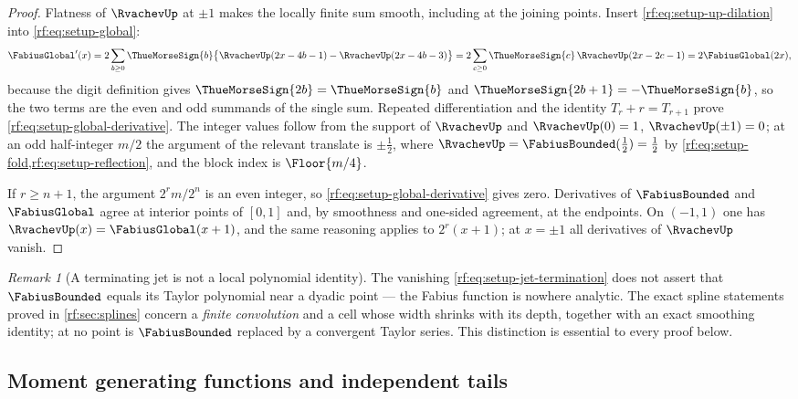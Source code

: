 \documentclass[11pt,oneside]{article}
\theoremstyle{plain}
\theoremstyle{definition}
\theoremstyle{remark}
\newtheorem{remark}[theorem]{Remark}
\newcommand{\Fb}{\FabiusBounded}            %
\newcommand{\Fg}{\FabiusGlobal}             %
\newcommand{\up}{\RvachevUp}                %
\newcommand{\tm}[1]{\ThueMorseSign{#1}}     %
\newcommand{\Tr}[1]{T_{#1}}                 %
\begin{document}
\begin{proof}
Flatness of $\up$ at $\pm1$ makes the locally finite sum smooth, including
at the joining points.  Insert \cref{rf:eq:setup-up-dilation} into
\cref{rf:eq:setup-global}:
\[
 \Fg'(x)=2\sum_{b\ge0}\tm{b}\bigl\{\up(2x-4b-1)-\up(2x-4b-3)\bigr\}
 =2\sum_{c\ge0}\tm{c}\,\up(2x-2c-1)=2\Fg(2x),
\]
because the digit definition gives $\tm{2b}=\tm{b}$ and
$\tm{2b+1}=-\tm{b}$, so the two terms are the even and odd summands of the
single sum.  Repeated differentiation and the identity
$\Tr{r}+r=\Tr{r+1}$ prove \cref{rf:eq:setup-global-derivative}.  The
integer values follow from the support of $\up$ and $\up(0)=1$, $\up(\pm1)=0$;
at an odd half-integer $m/2$ the argument of the relevant translate is
$\pm\tfrac12$, where $\up=\Fb(\tfrac12)=\tfrac12$ by
\cref{rf:eq:setup-fold,rf:eq:setup-reflection}, and the block index is
$\Floor{m/4}$.

If $r\ge n+1$, the argument $2^{r}m/2^{n}$ is an even integer, so
\cref{rf:eq:setup-global-derivative} gives zero.  Derivatives of $\Fb$ and
$\Fg$ agree at interior points of $[0,1]$ and, by smoothness and one-sided
agreement, at the endpoints.  On $(-1,1)$ one has $\up(x)=\Fg(x+1)$, and the
same reasoning applies to $2^{r}(x+1)$; at $x=\pm1$ all derivatives of $\up$
vanish.
\end{proof}

\begin{remark}[A terminating jet is not a local polynomial identity]
\label{rf:rmk:setup-jet}
The vanishing \cref{rf:eq:setup-jet-termination} does not assert that $\Fb$
equals its Taylor polynomial near a dyadic point --- the Fabius function is
nowhere analytic.  The exact spline statements proved in
\cref{rf:sec:splines} concern a \emph{finite convolution} and a cell whose
width shrinks with its depth, together with an exact smoothing identity; at
no point is $\Fb$ replaced by a convergent Taylor series.  This distinction
is essential to every proof below.
\end{remark}

\subsection{Moment generating functions and independent tails}
\label{rf:sec:setup-mgf}
\end{document}
